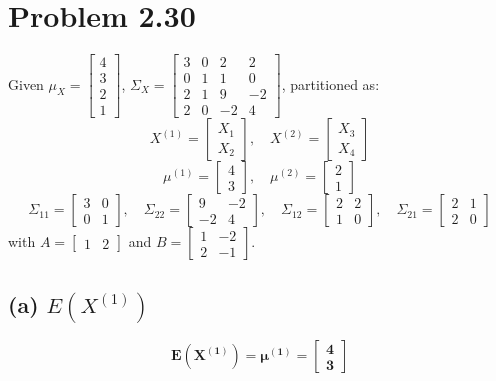\documentclass[11pt]{article}
\begin{document}
\section*{Problem 2.30}
Given $\mu_X = \begin{bmatrix} 4 \\ 3 \\ 2 \\ 1 \end{bmatrix}$, $\Sigma_X = \begin{bmatrix} 3 & 0 & 2 & 2 \\ 0 & 1 & 1 & 0 \\ 2 & 1 & 9 & -2 \\ 2 & 0 & -2 & 4 \end{bmatrix}$, partitioned as:
\[
X^{(1)} = \begin{bmatrix} X_1 \\ X_2 \end{bmatrix}, \quad X^{(2)} = \begin{bmatrix} X_3 \\ X_4 \end{bmatrix}
\]
\[
\mu^{(1)} = \begin{bmatrix} 4 \\ 3 \end{bmatrix}, \quad \mu^{(2)} = \begin{bmatrix} 2 \\ 1 \end{bmatrix}
\]
\[
\Sigma_{11} = \begin{bmatrix} 3 & 0 \\ 0 & 1 \end{bmatrix}, \quad \Sigma_{22} = \begin{bmatrix} 9 & -2 \\ -2 & 4 \end{bmatrix}, \quad \Sigma_{12} = \begin{bmatrix} 2 & 2 \\ 1 & 0 \end{bmatrix}, \quad \Sigma_{21} = \begin{bmatrix} 2 & 1 \\ 2 & 0 \end{bmatrix}
\]
with $A = \begin{bmatrix} 1 & 2 \end{bmatrix}$ and $B = \begin{bmatrix} 1 & -2 \\ 2 & -1 \end{bmatrix}$.

\subsection*{(a) $E(X^{(1)})$}
\[
\mathbf{E(X^{(1)}) = \mu^{(1)} = \begin{bmatrix} 4 \\ 3 \end{bmatrix}}
\]
\end{document}
